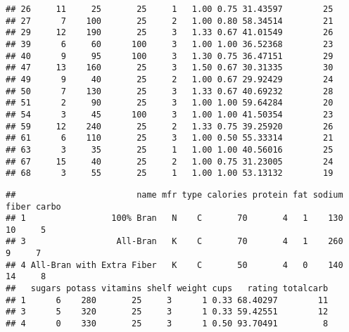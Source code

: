 \documentclass[
]{article}
\newenvironment{Shaded}{\begin{snugshade}}{\end{snugshade}}
\newcommand{\CommentTok}[1]{\textcolor[rgb]{0.56,0.35,0.01}{\textit{#1}}}
\newcommand{\DecValTok}[1]{\textcolor[rgb]{0.00,0.00,0.81}{#1}}
\newcommand{\FunctionTok}[1]{\textcolor[rgb]{0.00,0.00,0.00}{#1}}
\newcommand{\NormalTok}[1]{#1}
\newcommand{\OtherTok}[1]{\textcolor[rgb]{0.56,0.35,0.01}{#1}}
\newcommand{\SpecialCharTok}[1]{\textcolor[rgb]{0.00,0.00,0.00}{#1}}
\begin{document}
\begin{verbatim}
## 26     11     25       25     1   1.00 0.75 31.43597        25
## 27      7    100       25     2   1.00 0.80 58.34514        21
## 29     12    190       25     3   1.33 0.67 41.01549        26
## 39      6     60      100     3   1.00 1.00 36.52368        23
## 40      9     95      100     3   1.30 0.75 36.47151        29
## 47     13    160       25     3   1.50 0.67 30.31335        30
## 49      9     40       25     2   1.00 0.67 29.92429        24
## 50      7    130       25     3   1.33 0.67 40.69232        28
## 51      2     90       25     3   1.00 1.00 59.64284        20
## 54      3     45      100     3   1.00 1.00 41.50354        23
## 59     12    240       25     2   1.33 0.75 39.25920        26
## 61      6    110       25     3   1.00 0.50 55.33314        21
## 63      3     35       25     1   1.00 1.00 40.56016        25
## 67     15     40       25     2   1.00 0.75 31.23005        24
## 68      3     55       25     1   1.00 1.00 53.13132        19
\end{verbatim}

\begin{Shaded}
\end{Shaded}

\begin{verbatim}
##                        name mfr type calories protein fat sodium fiber carbo
## 1                 100% Bran   N    C       70       4   1    130    10     5
## 3                  All-Bran   K    C       70       4   1    260     9     7
## 4 All-Bran with Extra Fiber   K    C       50       4   0    140    14     8
##   sugars potass vitamins shelf weight cups   rating totalcarb
## 1      6    280       25     3      1 0.33 68.40297        11
## 3      5    320       25     3      1 0.33 59.42551        12
## 4      0    330       25     3      1 0.50 93.70491         8
\end{verbatim}

\begin{Shaded}
\end{Shaded}
\end{document}

